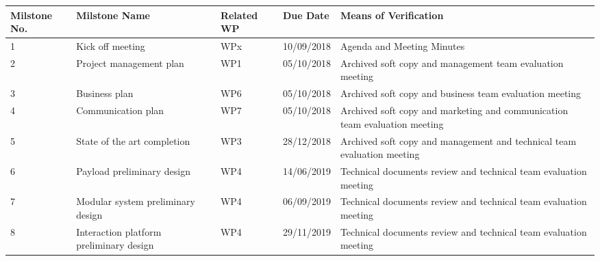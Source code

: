\begin{longtable}[H]{p{1.9cm} p{3cm} p{2.2cm} p{2cm} l }
	\toprule[2pt]
	
	\textbf{Milstone No.} & \textbf{Milstone Name} & \textbf{Related WP} & \textbf{Due Date} & \textbf{Means of Verification} \\
	
	\midrule[1.5pt] 
	\endhead
	
	1 & Kick off meeting & WPx & 10/09/2018 & Agenda and Meeting Minutes \vspace{0.2cm} \\
	
	\midrule

	2 & Project management plan & WP1 & 05/10/2018 & Archived soft copy and management team evaluation meeting \vspace{0.2cm} \\
	
	\midrule
	
	3 & Business plan & WP6 & 05/10/2018 & Archived soft copy and business team evaluation meeting \vspace{0.2cm} \\

	\midrule

 	4 & Communication plan & WP7 & 05/10/2018 & Archived soft copy and marketing and communication team evaluation meeting \vspace{0.2cm} \\
 	 
 	\midrule
 	 
 	5 & State of the art completion & WP3 & 28/12/2018 & Archived soft copy and management and technical team evaluation meeting \vspace{0.2cm} \\
 	
 	\midrule
 
 	6 & Payload preliminary design & WP4 & 14/06/2019 & Technical documents review and technical team evaluation meeting \vspace{0.2cm} \\
 
 	\midrule
 
  	7 & Modular system preliminary design & WP4 & 06/09/2019 & Technical documents review and technical team evaluation meeting \vspace{0.2cm} \\
 
 	\midrule
 
 	8 & Interaction platform preliminary design & WP4 & 29/11/2019 & Technical documents review and technical team evaluation meeting \vspace{0.2cm} \\
 

\end{longtable}
